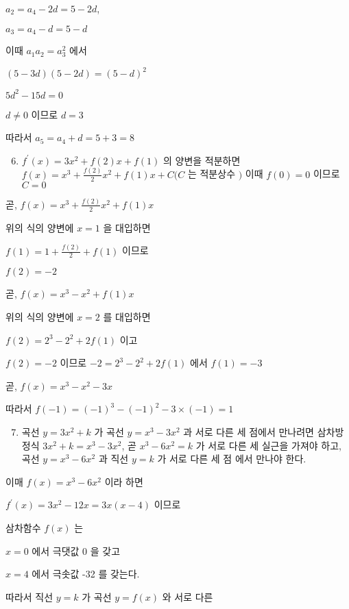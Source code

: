 \documentclass[10pt]{article}
\begin{document}
\(a_{2}=a_{4}-2 d=5-2 d\),

\(a_{3}=a_{4}-d=5-d\)

이때 \(a_{1} a_{2}=a_{3}^{2}\) 에서

\((5-3 d)(5-2 d)=(5-d)^{2}\)

\(5 d^{2}-15 d=0\)

\(d \neq 0\) 이므로 \(d=3\)

따라서 \(a_{5}=a_{4}+d=5+3=8\)

\begin{enumerate}
  \setcounter{enumi}{5}
  \item \(f^{\prime}(x)=3 x^{2}+f(2) x+f(1)\) 의 양변을 적분하면 \(f(x)=x^{3}+\frac{f(2)}{2} x^{2}+f(1) x+C(C\) 는 적분상수 \()\) 이때 \(f(0)=0\) 이므로 \(C=0\)
\end{enumerate}

곧, \(f(x)=x^{3}+\frac{f(2)}{2} x^{2}+f(1) x\)

위의 식의 양변에 \(x=1\) 을 대입하면

\(f(1)=1+\frac{f(2)}{2}+f(1)\) 이므로

\(f(2)=-2\)

곧, \(f(x)=x^{3}-x^{2}+f(1) x\)

위의 식의 양변에 \(x=2\) 를 대입하면

\(f(2)=2^{3}-2^{2}+2 f(1)\) 이고

\(f(2)=-2\) 이므로 \(-2=2^{3}-2^{2}+2 f(1)\) 에서 \(f(1)=-3\)

곧, \(f(x)=x^{3}-x^{2}-3 x\)

따라서 \(f(-1)=(-1)^{3}-(-1)^{2}-3 \times(-1)=1\)

\begin{enumerate}
  \setcounter{enumi}{6}
  \item 곡선 \(y=3 x^{2}+k\) 가 곡선 \(y=x^{3}-3 x^{2}\) 과 서로 다른 세 점에서 만나려면 삼차방정식 \(3 x^{2}+k=x^{3}-3 x^{2}\), 곧 \(x^{3}-6 x^{2}=k\) 가 서로 다른 세 실근을 가져야 하고, 곡선 \(y=x^{3}-6 x^{2}\) 과 직선 \(y=k\) 가 서로 다른 세 점 에서 만나야 한다.
\end{enumerate}

이매 \(f(x)=x^{3}-6 x^{2}\) 이라 하면

\(f^{\prime}(x)=3 x^{2}-12 x=3 x(x-4)\) 이므로

삼차함수 \(f(x)\) 는

\(x=0\) 에서 극댓값 0 을 갖고

\(x=4\) 에서 극솟값 -32 를 갖는다.

따라서 직선 \(y=k\) 가 곡선 \(y=f(x)\) 와 서로 다른
\end{document}
